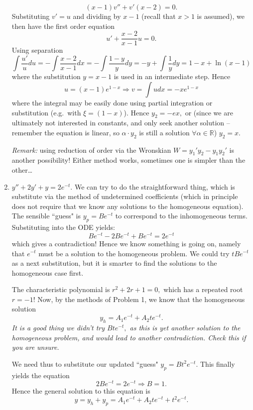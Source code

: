 \documentclass[a4paper,12pt,leqno]{article}
\begin{document}
\begin{enumerate}
\[ (x-1)v'' + v'(x-2) = 0. \]
Substituting $v' = u$ and dividing by $x-1$ (recall that $x>1$ is assumed), we then have the first order equation 
\[ u' + \frac{x-2}{x-1} u = 0. \]
Using separation
\[  \int \frac{u'}{u} du = -\int \frac{x-2}{x-1} dx = -\int \frac{1-y}{y} dy = -y + \int \frac{1}{y} dy = 1 - x + \ln(x-1) \]
where the substitution $y = x-1$ is used in an intermediate step. Hence
\[ u = (x-1)e^{1-x} \Rightarrow v = \int u dx = -x e^{1-x} \]
where the integral may be easily done using partial integration or substitution (e.g.\ with $\xi = (1-x)$). Hence $y_2 = -ex,$ or (since we are ultimately not interested in constants, and only seek another solution -- remember the equation is linear, so $\alpha \cdot y_2$ is still a solution $\forall \alpha \in \mathbb{R}$) $y_2 = x.$ 

\emph{Remark:} using reduction of order via the Wronskian $W = y_1' y_2 - y_1 y_2'$ is another possibility! Either method works, sometimes one is simpler than the other\ldots
\item $y'' + 2y' + y = 2e^{-t}.$ We can try to do the straightforward thing, which is substitute via the method of undetermined coefficients (which in principle does not require that we know any solutions to the homogeneous equation). The sensible ``guess" is $y_p = Be^{-t}$ to correspond to the inhomogeneous terms. Substituting into the ODE yields:
\[ Be^{-t} - 2Be^{-t} + Be^{-t} = 2e^{-t} \]
which gives a contradiction! Hence we know something is going on, namely that $e^{-t}$ must be a solution to the homogeneous problem. We could try $tBe^{-t}$ as a next substitution, but it is smarter to find the solutions to the homogeneous case first.

The characteristic polynomial is $r^2 + 2r + 1 = 0,$ which has a repeated root $r = -1!$ Now, by the methods of Problem 1, we know that the homogeneous solution 
\[ y_h = A_1e^{-t} + A_2te^{-t}. \]
\emph{It is a good thing we didn't try $Bte^{-t},$ as this is yet another solution to the homogeneous problem, and would lead to another contradiction. Check this if you are unsure.}

We need thus to substitute our updated ``guess" $y_p = Bt^2 e^{-t}.$ This finally yields the equation 
\[ 2 B e^{-t} = 2 e^{-t} \Rightarrow B = 1.\] Hence the general solution to this equation is 
\[ y = y_h + y_p = A_1e^{-t} + A_2te^{-t} + t^2 e^{-t}. \]
\end{enumerate}
\end{document}
